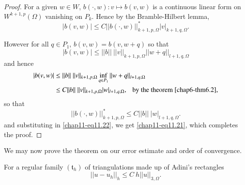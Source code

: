 \begin{proof}
For a given $w\in W$, $b(\cdot,w):v\mapsto b(v,w)$ is a continuous
linear form on $W^{k+1,p}(\Omega)$ vanishing on $P_{k}$. Hence by the
Bramble-Hilbert lemma,
\begin{equation*}
|b(v,w)|\leq
C||b(\cdot,w)||^{*}_{k+1,p,\Omega}|v|_{k+1,q,\Omega}.\tag{11.22}\label{chap11-eq11.22} 
\end{equation*}

However for all $q\in P_{1}$, $b(v,w)=b(v,w+q)$ so that
$$
|b(v,w)| \leq ||b||~||v||_{k+1,p,\Omega}||w+q||_{l+1,q,\Omega}
$$
and hence
\begin{align*}
|b(v,w)| &\leq ||b||~||v||_{k+1,p,\Omega}\inf\limits_{q\in
  P_{1}}||w+q||_{l+1,q,\Omega}\\ 
&\leq C||b||~||v||_{k+1,p,\Omega}|w|_{l+1,q,\Omega},\text{~~ by the
  theorem \ref{chap6-thm6.2},}
\end{align*}
so that
$$
||b(\cdot,w)||^{*}_{k+1,p,\Omega}\leq C||b||~|w|_{l+1,q,\Omega}.
$$
and substituting in \eqref{chap11-eq11.22}, we get
\eqref{chap11-eq11.21}, which completes the proof.
\end{proof}

We may now prove the theorem on our error estimate and order of
convergence.

\begin{theorem}\label{chap11-thm11.3}
For a regular family $(\mathfrak{t}_{h})$ of triangulations made up of
Adini's rectangles
\begin{equation*}
||u-u_{h}||_{h}\leq C\ h||u||_{3,\Omega}.\tag{11.23}\label{chap11-eq11.23}
\end{equation*}
\end{theorem}

